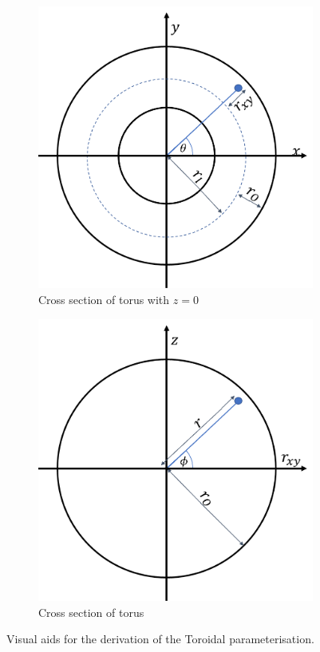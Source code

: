 \documentclass[12pt,a4paper]{article}
\begin{document}
\begin{figure}[H]
 \begin{subfigure}{0.5\textwidth}
     \includegraphics[width=\textwidth]{Pics/TorusCordsXY.png}
     \caption{Cross section of torus with $z=0$}
     \label{Torus_XY}
 \end{subfigure}
 \hfill
 \begin{subfigure}{0.5\textwidth}
     \includegraphics[width=\textwidth]{Pics/TorusCordsr_XYZ.png}
     \caption{Cross section of torus}
     \label{Torus_z}
 \end{subfigure}
 \caption{Visual aids for the derivation of the Toroidal parameterisation.} \label{BO}
\end{figure}
\end{document}
